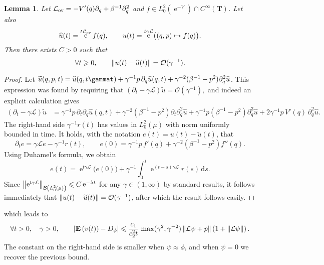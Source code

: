 \documentclass[11pt,a4paper]{article}
\DeclareMathOperator{\e}{e}
\newcommand{\expect}[0]{\mathbf{E}}
\newcommand{\torus}{\mathbf T}
\renewcommand{\d}{\mathrm d}
\theoremstyle{plain}
\newtheorem{lemma}{Lemma}[section]
\numberwithin{equation}{section}
\renewcommand{\leq}{\leqslant}
\renewcommand{\geq}{\geqslant}
\begin{document}
\begin{lemma}
    Let $\mathcal L_{\rm ov} = - V'(q) \partial_q + \beta^{-1} \partial_q^2$ and $f \in L^2_0(\e^{-V}) \cap C^{\infty}(\torus)$.
    Let also
    \[
        \widehat u(t) = \e^{t\mathcal L_{\rm ov}} f(q), \qquad
        u(t) = \e^{t \gamma\mathcal L} \bigl( (q,p) \mapsto f(q) \bigr).
    \]
    Then there exists $C > 0$ such that
    \[
        \forall t \geq 0, \qquad
        \norm{u(t)  - \widehat u(t)} = \mathcal O(\gamma^{-1}).
    \]
\end{lemma}
\begin{proof}
    Let $\widetilde u(q, p, t) = \widehat u(q, t\gammat) + \gamma^{-1} p \, \partial_q \widehat u(q, t) + \gamma^{-2} (\beta^{-1} - p^2) \partial_q^{2} \widehat u$.
    This expression was found by requiring that
    \(
        (\partial_t - \gamma \mathcal L) \widetilde u = \mathcal O(\gamma^{-1}),
    \)
    and indeed an explicit calculation gives
    \begin{align*}
        (\partial_t - \gamma \mathcal L) \widetilde u
        &= \gamma^{-1} p \, \partial_t \partial_q \widehat u(q, t) + \gamma^{-2} (\beta^{-1} - p^2) \partial_t \partial_q^{2} \widehat u
        + \gamma^{-1} p (\beta^{-1} - p^2) \partial_q^{3} \widehat u + 2 \gamma^{-1} p \, V'(q) \, \partial_q^2 \widehat u.
    \end{align*}
    The right-hand side $\gamma^{-1} r(t)$ has values in $L^2_0(\mu)$ with norm uniformly bounded in time.
    It holds, with the notation $e(t) = u(t) - \widetilde u(t)$, that
    \[
        \partial_t e = \gamma \mathcal L e - \gamma^{-1} r(t), \qquad
        e(0) = \gamma^{-1} p \, f'(q) + \gamma^{-2} (\beta^{-1} - p^2) f''(q).
    \]
    Using Duhamel's formula,
    we obtain
    \[
        e(t) = \e^{t \gamma \mathcal L} \bigl( e(0) \bigr) + \gamma^{-1} \int_{0}^{t} \e^{(t- s) \gamma \mathcal L} r(s) \, \d s.
    \]
    Since $\norm{\e^{t\gamma \mathcal L}}[\mathcal B\left(L^2_0(\mu)\right)] \leq C \e^{- \lambda t}$ for any $\gamma \in (1, \infty)$ by standard results,
    it follows immediately that $\norm{u(t) - \widetilde u(t)} = \mathcal O(\gamma^{-1})$,
    after which the result follows easily.
\end{proof}

which leads to
\begin{align*}
    \forall t > 0, \quad \gamma > 0, \qquad
    \abs{\expect \left( v(t) \right) - D_{\phi}}
    \leq \frac{c_1}{c_2^2 t} \, \max(\gamma^2, \gamma^{-2}) \norm{\mathcal L\psi + p}  \left(1 + \norm{\mathcal L \psi} \right).
\end{align*}
The constant on the right-hand side is smaller when $\psi \approx \phi$,
and when $\psi = 0$ we recover the previous bound.
\end{document}

